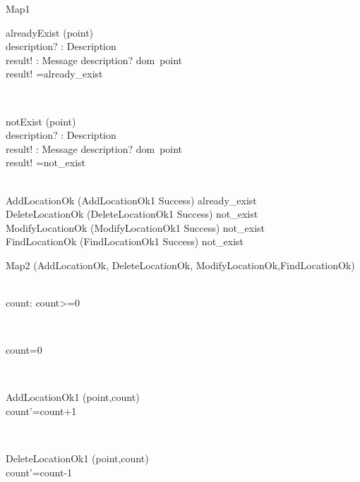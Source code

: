\documentclass[12pt]{article}
\begin{document}
\begin{spacing}{1.5}
\begin{class}{Map1}
\begin{op}{alreadyExist}
\Xi (point) \\
description? : Description\\
result! : Message
\ST
description? \in dom~point  \\
result! =already\_exist
\end{op}\\
\begin{op}{notExist}
\Xi (point) \\
description? : Description\\
result! : Message
\ST
description? \notin dom~point 
\\
result! =not\_exist
\end{op}\\
AddLocationOk \stackrel{\frown}{=} (AddLocationOk1 \wedge Success) \vee already\_exist \\
DeleteLocationOk \stackrel{\frown}{=} (DeleteLocationOk1 \wedge Success) \vee not\_exist \\
ModifyLocationOk \stackrel{\frown}{=} (ModifyLocationOk1 \wedge Success) \vee not\_exist \\
FindLocationOk \stackrel{\frown}{=} (FindLocationOk1 \wedge Success) \vee not\_exist \\
\end{class}
\begin{class}{Map2}
\also
\upharpoonright (AddLocationOk, DeleteLocationOk, ModifyLocationOk,FindLocationOk) \\
 \\
\begin{state}
count:
\where
count>=0
\end{state} \\
\begin{init}
count=0
\end{init} \\
\begin{op}{AddLocationOk1}
\Delta (point,count) \\
\ST
count'=count+1
\end{op}\\
\begin{op}{DeleteLocationOk1}
\Delta (point,count) \\
\ST
count'=count-1
\end{op}\\
\end{class}
\end{spacing}
\end{document}
